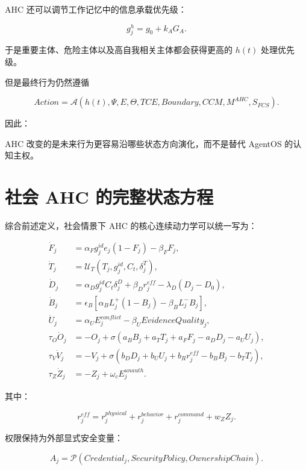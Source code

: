 AHC 还可以调节工作记忆中的信息承载优先级：

\[
g_j^h
=
g_0
+
k_AG_A.
\]

于是重要主体、危险主体以及高自我相关主体都会获得更高的 $h(t)$ 处理优先级。

但是最终行为仍然遵循

\[
Action
=
\mathcal A
\left(
h(t),
\Psi,
E,
\Theta,
TCE,
Boundary,
CCM,
M^{AHC},
S_{FCS}
\right).
\]

因此：

\begin{statementbox}
\centering
{}
\end{statementbox}

AHC 改变的是未来行为更容易沿哪些状态方向演化，而不是替代 AgentOS 的认知主权。


\section{社会 AHC 的完整状态方程}

综合前述定义，社会情景下 AHC 的核心连续动力学可以统一写为：

\[
\boxed{
\begin{aligned}
\dot F_j
&=
\alpha_F
g_j^{id}
e_j
(1-F_j)
-
\beta_FF_j,
\\[4pt]
\dot T_j
&=
\mathcal U_T
\left(
T_j,
g_j^{id},
C_t,
\delta_j^T
\right),
\\[4pt]
\dot D_j
&=
\alpha_D
g_j^{id}
C_t
\delta_j^D
+
\beta_D
r_j^{eff}
-
\lambda_D
(D_j-D_0),
\\[4pt]
\dot B_j
&=
\epsilon_B
\left[
\alpha_BL_j^+
(1-B_j)
-
\beta_BL_j^-B_j
\right],
\\[4pt]
\dot U_j
&=
\alpha_U
E_j^{conflict}
-
\beta_U
EvidenceQuality_j,
\\[4pt]
\tau_O
\dot O_j
&=
-O_j
+
\sigma
\left(
a_BB_j
+
a_TT_j
+
a_FF_j
-
a_DD_j
-
a_UU_j
\right),
\\[4pt]
\tau_V
\dot V_j
&=
-V_j
+
\sigma
\left(
b_DD_j
+
b_UU_j
+
b_Rr_j^{eff}
-
b_BB_j
-
b_TT_j
\right),
\\[4pt]
\tau_Z
\dot Z_j
&=
-Z_j
+
\omega_c
E_j^{unauth}.
\end{aligned}
}
\]

其中：

\[
r_j^{eff}
=
r_j^{physical}
+
r_j^{behavior}
+
r_j^{command}
+
w_ZZ_j.
\]

权限保持为外部显式安全变量：

\[
\boxed{
A_j
=
\mathcal P
\left(
Credential_j,
SecurityPolicy,
OwnershipChain
\right).
}
\]

